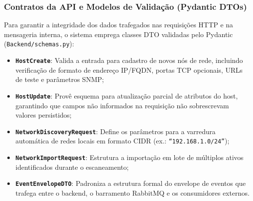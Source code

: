 \documentclass[12pt,a4paper]{article}
\begin{document}
\subsubsection{Contratos da API e Modelos de Validação (Pydantic DTOs)}
Para garantir a integridade dos dados trafegados nas requisições HTTP e na mensageria interna, o sistema emprega classes DTO validadas pelo Pydantic (\texttt{Backend/schemas.py}):
\begin{itemize}[leftmargin=1.25cm]
\item \textbf{\texttt{HostCreate}}: Valida a entrada para cadastro de novos nós de rede, incluindo verificação de formato de endereço IP/FQDN, portas TCP opcionais, URLs de teste e parâmetros SNMP;
\item \textbf{\texttt{HostUpdate}}: Provê esquema para atualização parcial de atributos do host, garantindo que campos não informados na requisição não sobrescrevam valores persistidos;
\item \textbf{\texttt{NetworkDiscoveryRequest}}: Define os parâmetros para a varredura automática de redes locais em formato CIDR (ex.: \texttt{``192.168.1.0/24''});
\item \textbf{\texttt{NetworkImportRequest}}: Estrutura a importação em lote de múltiplos ativos identificados durante o escaneamento;
\item \textbf{\texttt{EventEnvelopeDTO}}: Padroniza a estrutura formal do envelope de eventos que trafega entre o backend, o barramento RabbitMQ e os consumidores externos.
\end{itemize}
\end{document}
